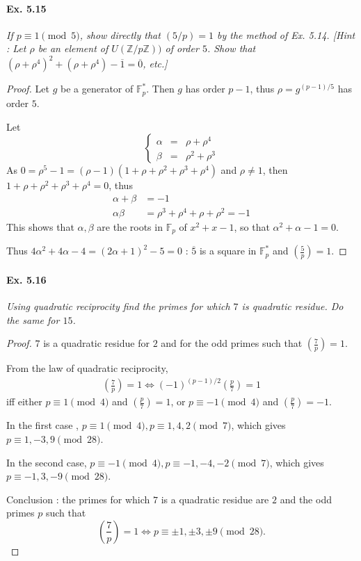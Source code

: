 \documentclass[11pt,a4paper]{article}
\newcommand{\Z}{\mathbb{Z}}
\newcommand{\F}{\mathbb{F}}
\newcommand{\legendre}[2]{\genfrac{(}{)}{}{}{#1}{#2}}
\begin{document}
\paragraph{Ex. 5.15}

{\it If $p \equiv 1 \pmod 5$, show directly that $(5/p) = 1$ by the method of Ex. 5.14. [Hint : Let $\rho$ be an element of $U(\Z/p\Z))$ of order $5$. Show that $(\rho+\rho^4)^2+ (\rho+\rho^4)-\overline{1}= \overline{0}$, etc.]
}

\begin{proof}
Let $g$ be a generator of $\F_p^*$. Then $g$ has order $p-1$, thus $\rho = g^{(p-1)/5}$ has order $5$.

Let 
$$
\left\{
\begin{array}{ccc}
  \alpha & =  & \rho + \rho^4  \\
  \beta &   = &  \rho^2 + \rho^3   
\end{array}
\right.
$$
As $0 = \rho^5- 1 = (\rho - 1)(1+\rho+\rho^2+\rho^3+\rho^4)$ and $\rho \neq 1$, then $1+\rho+\rho^2+\rho^3+\rho^4=0$, thus
\begin{align*}
\alpha+ \beta &= -1\\
\alpha\beta &= \rho^3+\rho^4+ \rho +\rho^2 = -1
\end{align*}
This shows that $\alpha,\beta$ are the roots in $\F_p$ of $x^2 +x - 1$, so that $\alpha^2+\alpha-1 = 0$.

Thus $4\alpha^2+4\alpha - 4 = (2\alpha+1)^2 - 5 = 0$ : $\overline{5}$ is a square in $\F_p^*$ and $\legendre{5}{p} = 1$.
\end{proof}

\paragraph{Ex. 5.16}

{\it  Using quadratic reciprocity find the primes for which $7$ is quadratic residue. Do the same for $15$.
}

\begin{proof}
$7$ is a quadratic residue for $2$ and for the odd primes such that $\legendre{7}{p} = 1$.

From the law of quadratic reciprocity,
\begin{align*}
\legendre{7}{p} = 1 \iff (-1)^{(p-1)/2} \legendre{p}{7} = 1
\end{align*}
iff either $p\equiv 1 \pmod 4$ and $\legendre{p}{7} =1$, or $p\equiv -1 \pmod 4$ and $\legendre{p}{7} =-1$.

In the first case , $p\equiv 1 \pmod 4, p\equiv 1,4,2 \pmod 7$, which gives $p \equiv 1,-3,9 \pmod {28}$.

In the second case, $p\equiv -1 \pmod 4, p\equiv -1,-4,-2 \pmod 7$, which gives $p\equiv -1,3,-9 \pmod {28}$.

Conclusion : the primes for which $7$ is a  quadratic residue are $2$ and the odd primes $p$ such that
$$\legendre {7}{p} = 1 \iff p \equiv \pm 1,\pm 3, \pm 9 \pmod{28}.$$
\end{proof}
\end{document}
